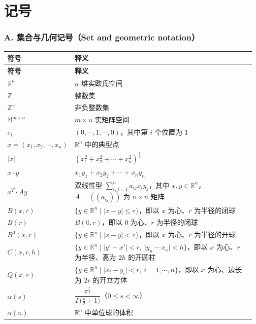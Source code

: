 \documentclass[../../main.tex]{subfiles}%
\begin{document}
\chapter*{记号}
\label{chapter:notation}

\subsection*{A. 集合与几何记号（Set and geometric notation）}

\begin{longtable}{@{}p{}p{}@{}}
\toprule
\textbf{符号} & \textbf{释义} \\
\midrule
\endfirsthead
\toprule
\textbf{符号} & \textbf{释义} \\
\midrule
\endhead
$\mathbb{R}^n$ & $n$ 维实欧氏空间 \\
$\mathbb{Z}$ & 整数集 \\
$\mathbb{Z}^+$ & 非负整数集 \\
$\mathbb{M}^{m\times n}$ & $m\times n$ 实矩阵空间 \\
$e_i$ & $(0,\cdots,1,\cdots,0)$，其中第 $i$ 个位置为 $1$ \\
$x=(x_1,x_2,\cdots,x_n)$ & $\mathbb{R}^n$ 中的典型点 \\
$\lvert x\rvert$ & $(x_1^2+x_2^2+\cdots+x_n^2)^{\frac{1}{2}}$ \\
$x\cdot y$ & $x_1y_1+x_2y_2+\cdots+x_ny_n$ \\
$x^T\cdot Ay$ & 双线性型 $\sum_{i,j=1}^{n}a_{ij}x_iy_j$，其中 $x,y\in\mathbb{R}^n$，$A=((a_{ij}))$ 为 $n\times n$ 矩阵 \\
$B(x,r)$ & $\{y\in\mathbb{R}^n\mid\lvert x-y\rvert\leqslant r\}$，即以 $x$ 为心、$r$ 为半径的闭球 \\
$B(r)$ & $B(0,r)$，即以 $0$ 为心、$r$ 为半径的闭球 \\
$B^0(x,r)$ & $\{y\in\mathbb{R}^n\mid\lvert x-y\rvert<r\}$，即以 $x$ 为心、$r$ 为半径的开球 \\
$C(x,r,h)$ & $\{y\in\mathbb{R}^n\mid\lvert y'-x'\rvert<r,\ \lvert y_n-x_n\rvert<h\}$，即以 $x$ 为心、$r$ 为半径、高为 $2h$ 的开圆柱 \\
$Q(x,r)$ & $\{y\in\mathbb{R}^n\mid\lvert x_i-y_i\rvert<r,\ i=1,\cdots,n\}$，即以 $x$ 为心、边长为 $2r$ 的开立方体 \\
$\alpha(s)$ & $\dfrac{\pi^{\frac{s}{2}}}{\Gamma\bigl(\frac{s}{2}+1\bigr)}$（$0\leqslant s<\infty$） \\
$\alpha(n)$ & $\mathbb{R}^n$ 中单位球的体积 \\

\end{longtable}
\end{document}
